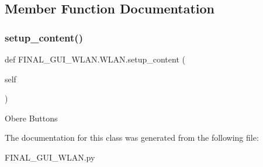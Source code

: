 \subsection{Member Function Documentation}
\mbox{\label{class_f_i_n_a_l___g_u_i___w_l_a_n_1_1_w_l_a_n_a5fe71f63b3060bb7a5d1511aa0eeaf1c}} 
\subsubsection{\texorpdfstring{setup\+\_\+content()}{setup\_content()}}
{\footnotesize\ttfamily def F\+I\+N\+A\+L\+\_\+\+G\+U\+I\+\_\+\+W\+L\+A\+N.\+W\+L\+A\+N.\+setup\+\_\+content (\begin{DoxyParamCaption}\item[{}]{self }\end{DoxyParamCaption})}

\begin{DoxyVerb}Obere Buttons\end{DoxyVerb}
 

The documentation for this class was generated from the following file\+:\begin{DoxyCompactItemize}
\item 
F\+I\+N\+A\+L\+\_\+\+G\+U\+I\+\_\+\+W\+L\+A\+N.\+py\end{DoxyCompactItemize}
